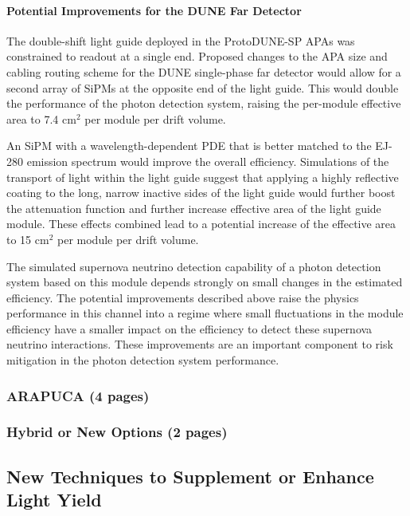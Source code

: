 \paragraph*{Potential Improvements for the DUNE Far Detector}

The double-shift light guide deployed in the ProtoDUNE-SP APAs was constrained 
to readout at a single end. Proposed changes to the APA size and cabling routing 
scheme for the DUNE single-phase far detector would allow for a second array of 
SiPMs at the opposite end of the light guide. This would double the performance of
 the photon detection system, raising the per-module effective area to 7.4 cm$^{2}$ 
per module per drift volume.

An SiPM with a wavelength-dependent PDE that is better matched to the EJ-280 emission 
spectrum would improve the overall efficiency. Simulations of the transport of light 
within the light guide suggest that applying a highly reflective coating to the long, 
narrow inactive sides of the light guide would further boost the attenuation function
 and further increase effective area of the light guide module. These effects combined 
lead to a potential increase of the effective area to 15 cm$^{2}$ per module per drift volume.

The simulated supernova neutrino detection capability of a photon detection system 
based on this module depends strongly on small changes in the estimated efficiency.
 The potential improvements described above raise the physics performance in this 
channel into a regime where small fluctuations in the module efficiency have a 
smaller impact on the efficiency to detect these supernova neutrino interactions. 
These improvements are an important component to risk mitigation in the photon 
detection system performance.


\subsubsection{ARAPUCA (4 pages)}
\label{ssec:fdsp-pd-pc-arapuca}

\subsubsection{Hybrid or New Options (2 pages)}
\label{ssec:fdsp-pd-pc-new}

\subsection{New Techniques to Supplement or Enhance Light Yield}
\label{sec:fdsp-pd-enh}

